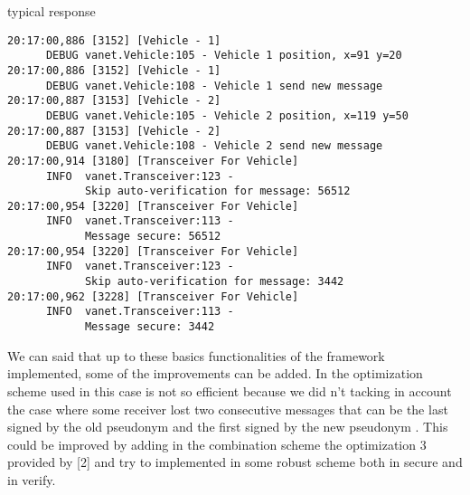 \hybrid typical response
\begin{verbatim}
20:17:00,886 [3152] [Vehicle - 1] 
      DEBUG vanet.Vehicle:105 - Vehicle 1 position, x=91 y=20
20:17:00,886 [3152] [Vehicle - 1] 
      DEBUG vanet.Vehicle:108 - Vehicle 1 send new message
20:17:00,887 [3153] [Vehicle - 2] 
      DEBUG vanet.Vehicle:105 - Vehicle 2 position, x=119 y=50
20:17:00,887 [3153] [Vehicle - 2] 
      DEBUG vanet.Vehicle:108 - Vehicle 2 send new message
20:17:00,914 [3180] [Transceiver For Vehicle] 
      INFO  vanet.Transceiver:123 - 
            Skip auto-verification for message: 56512
20:17:00,954 [3220] [Transceiver For Vehicle] 
      INFO  vanet.Transceiver:113 - 
            Message secure: 56512
20:17:00,954 [3220] [Transceiver For Vehicle] 
      INFO  vanet.Transceiver:123 - 
            Skip auto-verification for message: 3442
20:17:00,962 [3228] [Transceiver For Vehicle] 
      INFO  vanet.Transceiver:113 - 
            Message secure: 3442
\end{verbatim}
We can said that up to these basics functionalities of the framework implemented, some of the improvements can be added.  In the optimization scheme used in this case is not so efficient because we did n't tacking in account the case where some receiver lost two consecutive messages that can be the last signed by the old pseudonym and the first signed by the  new pseudonym . This could be improved by adding in the combination scheme the optimization 3 provided by [2] and try to implemented in some robust scheme both in secure and in verify.\\
